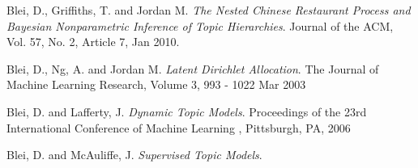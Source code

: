 \documentclass[DIV=calc, paper=a4, fontsize=11pt, twocolumn]{scrartcl}	 %
\begin{document}
\begin{thebibliography}{99}

  Blei, D., Griffiths, T. and Jordan M.
  \emph{The Nested Chinese Restaurant Process and Bayesian Nonparametric Inference of Topic Hierarchies}.
  Journal of the ACM, Vol. 57, No. 2, Article 7,
 Jan 2010.
 
  Blei, D., Ng, A. and Jordan M.
  \emph{Latent Dirichlet Allocation}.
  The Journal of Machine Learning Research,
 Volume 3, 993 - 1022
 Mar 2003
 
  Blei, D. and Lafferty, J.
  \emph{Dynamic Topic Models}.
  Proceedings of the 23rd International Conference of Machine Learning ,
 Pittsburgh, PA,
 2006
 
  Blei, D. and McAuliffe, J.
  \emph{Supervised Topic Models}.
 
\end{thebibliography}
\end{document}
